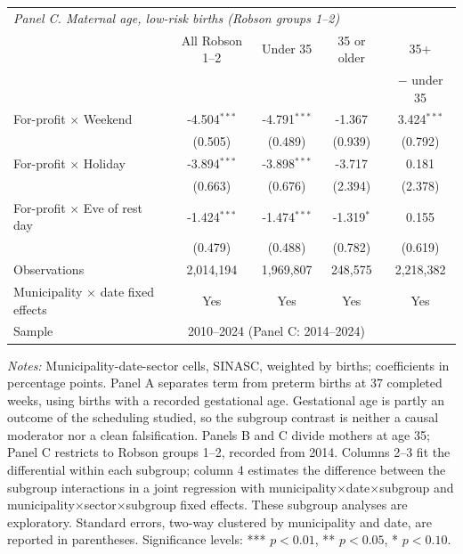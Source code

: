 \begin{table}[H]
{\begin{tabular}{lcccc}
\midrule
\multicolumn{5}{l}{\emph{Panel C. Maternal age, low-risk births (Robson groups 1--2)}} \\
\addlinespace[2pt]
 & All Robson 1--2 & Under 35 & 35 or older & 35+ \\
 &  &  &  & $-$ under 35 \\
\addlinespace[3pt]
For-profit $\times$ Weekend & -4.504$^{***}$ & -4.791$^{***}$ & -1.367 & 3.424$^{***}$ \\
 & (0.505) & (0.489) & (0.939) & (0.792) \\
\addlinespace[2pt]
For-profit $\times$ Holiday & -3.894$^{***}$ & -3.898$^{***}$ & -3.717 & 0.181 \\
 & (0.663) & (0.676) & (2.394) & (2.378) \\
\addlinespace[2pt]
For-profit $\times$ Eve of rest day & -1.424$^{***}$ & -1.474$^{***}$ & -1.319$^{*}$ & 0.155 \\
 & (0.479) & (0.488) & (0.782) & (0.619) \\
\addlinespace[2pt]
\midrule
Observations & 2,014,194 & 1,969,807 & 248,575 & 2,218,382 \\
\midrule
Municipality $\times$ date fixed effects & Yes & Yes & Yes & Yes \\
Sample & \multicolumn{3}{c}{2010--2024 (Panel C: 2014--2024)} & \\
\bottomrule
\end{tabular}}
\begin{minipage}{\linewidth}\footnotesize
\textit{Notes:} Municipality-date-sector cells, SINASC, weighted by births; coefficients in percentage points. Panel A separates term from preterm births at 37 completed weeks, using births with a recorded gestational age. Gestational age is partly an outcome of the scheduling studied, so the subgroup contrast is neither a causal moderator nor a clean falsification. Panels B and C divide mothers at age 35; Panel C restricts to Robson groups 1--2, recorded from 2014. Columns 2--3 fit the differential within each subgroup; column 4 estimates the difference between the subgroup interactions in a joint regression with municipality$\times$date$\times$subgroup and municipality$\times$sector$\times$subgroup fixed effects. These subgroup analyses are exploratory. Standard errors, two-way clustered by municipality and date, are reported in parentheses.
\newline
\footnotesize Significance levels: *** $p<0.01$, ** $p<0.05$, * $p<0.10$.
\end{minipage}
\end{table}
